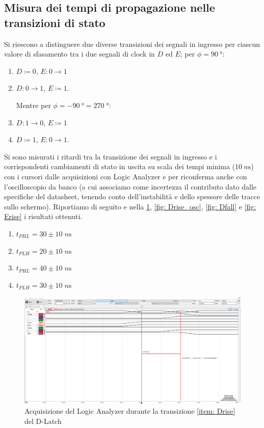 \documentclass[10pt, a4paper, italian]{article}
\begin{document}
\subsection{Misura dei tempi di propagazione nelle transizioni di stato}
Si riescono a distinguere due diverse transizioni dei segnali in ingresso per
ciascun valore di sfasamento tra i due segnali di clock in $D$ ed $E$;
per $\phi = \SI{90}{\degree}$:
\begin{enumerate}
\item $D \coloneqq 0$, $E: 0 \to 1$ \label{item: Efall}
\item $D: 0 \to 1$, $E \coloneqq 1$. \label{item: Drise}

Mentre per $\phi = - \SI{90}{\degree} = 270 \; \si{\degree}$:
\item $D: 1 \to 0$, $E \coloneqq 1$ \label{item: Dfall}
\item $D \coloneqq 1$, $E: 0 \to 1$. \label{item: Erise}
\end{enumerate}

Si sono misurati i ritardi tra la transizione dei segnali in ingresso e i
corrispondenti cambiamenti di stato in uscita su scala dei tempi minima
($\SI{10}{n\s}$) con i cursori dalle acquisizioni con Logic Analyzer e per
riconferma anche con l'oscilloscopio da banco (a cui associamo come
incertezza il contributo dato dalle specifiche del datasheet, tenendo conto
dell'instabilità e dello spessore delle tracce sullo schermo). Riportiamo
di seguito e nella \cref{fig: Drise}, \cref{fig: Drise_osc}, \cref{fig: Dfall}
e \cref{fig: Erise} i risultati ottenuti.
\begin{enumerate}
\item $t_{PHL} = 30 \pm 10 \; \si{n\s}$
\item $t_{PLH} = 20 \pm 10 \; \si{n\s}$

\item $t_{PHL} = 40 \pm 10 \; \si{n\s}$
\item $t_{PLH} = 30 \pm 10 \; \si{n\s}$
\end{enumerate}

\begin{figure}[htbp]
    \centering
    \includegraphics[width=\textwidth]{dlatch_Drise}
    \caption{Acquisizione del Logic Analyzer durante la transizione
    \ref{item: Drise} del D-Latch \label{fig: Drise}}
\end{figure}
\end{document}
